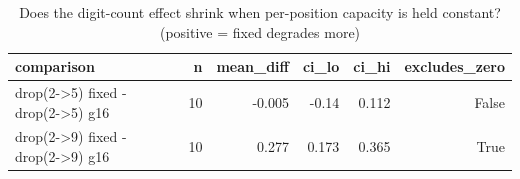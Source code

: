 \begin{table}[t]
\centering
\small
\begin{tabular}{lrrrrr}
\toprule
comparison & n & mean\_diff & ci\_lo & ci\_hi & excludes\_zero \\
\midrule
drop(2->5) fixed - drop(2->5) g16 & 10 & -0.005 & -0.14 & 0.112 & False \\
drop(2->9) fixed - drop(2->9) g16 & 10 & 0.277 & 0.173 & 0.365 & True \\
\bottomrule
\end{tabular}
\caption{Does the digit-count effect shrink when per-position capacity is held constant? (positive = fixed degrades more)}
\label{tab:capacity_drop_paired}
\end{table}